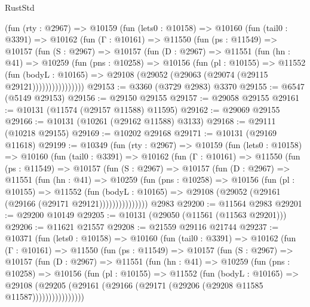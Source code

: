 \begin{lexlean}{RustStd}
\begin{coremodule}
      (fun (rty : @2967) =>
      @10159
        (fun (lets0 : @10158) =>
        @10160
          (fun (tail0 : @3391) =>
          @10162
            (fun (Γ : @10161) =>
            @11550
              (fun (ps : @11549) =>
              @10157
                (fun (S : @2967) =>
                @10157
                  (fun (D : @2967) =>
                  @11551
                    (fun (hn : @41) =>
                    @10259
                      (fun (pns : @10258) =>
                      @10156
                        (fun (pl : @10155) =>
                        @11552
                          (fun (bodyL : @10165) =>
                          @29108 (@29052 (@29063 (@29074 (@29115 @29121))))))))))))))))
@29153 := @3360 (@3729 @2983) @3370
@29155 := @6547 (@5149 @29153)
@29156 := @29150 @29155
@29157 := @29058 @29155
@29161 := @10131 (@11574 (@29157 @11588) @11595)
@29162 := @29069 @29155
@29166 := @10131 (@10261 (@29162 @11588) @3133)
@29168 := @29111 (@10218 @29155)
@29169 := @10202 @29168
@29171 := @10131 (@29169 @11618)
@29199 := @10349
    (fun (rty : @2967) =>
    @10159
      (fun (lets0 : @10158) =>
      @10160
        (fun (tail0 : @3391) =>
        @10162
          (fun (Γ : @10161) =>
          @11550
            (fun (ps : @11549) =>
            @10157
              (fun (S : @2967) =>
              @10157
                (fun (D : @2967) =>
                @11551
                  (fun (hn : @41) =>
                  @10259
                    (fun (pns : @10258) =>
                    @10156
                      (fun (pl : @10155) =>
                      @11552
                        (fun (bodyL : @10165) =>
                        @29108 (@29052 (@29161 (@29166 (@29171 @29121)))))))))))))))
    @2983
@29200 := @11564 @2983
@29201 := @29200 @10149
@29205 := @10131 (@29050 (@11561 (@11563 @29201)))
@29206 := @11621 @21557
@29208 := @21559 @29116 @21744
@29237 := @10371
    (fun (lets0 : @10158) =>
    @10160
      (fun (tail0 : @3391) =>
      @10162
        (fun (Γ : @10161) =>
        @11550
          (fun (ps : @11549) =>
          @10157
            (fun (S : @2967) =>
            @10157
              (fun (D : @2967) =>
              @11551
                (fun (hn : @41) =>
                @10259
                  (fun (pns : @10258) =>
                  @10156
                    (fun (pl : @10155) =>
                    @11552
                      (fun (bodyL : @10165) =>
                      @29108
                        (@29205
                          (@29161 (@29166 (@29171 (@29206 (@29208 @11585 @11587))))))))))))))))

\end{coremodule}
\end{lexlean}
